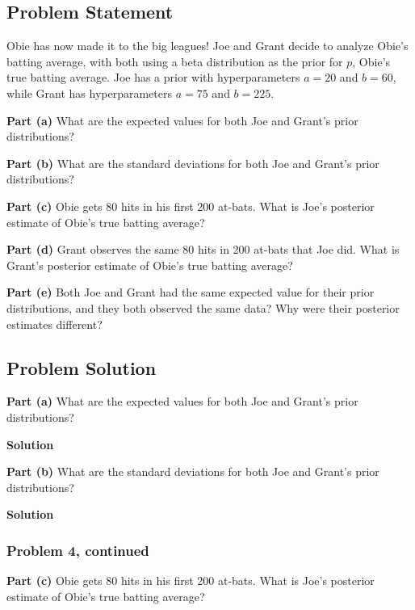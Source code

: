 \documentclass[12pt]{article}
\theoremstyle{definition}
\begin{document}
\subsection*{Problem Statement}

Obie has now made it to the big leagues! Joe and Grant decide to analyze Obie's batting average, with both using a beta distribution as the prior for $p$, Obie's true batting average. Joe has a prior with hyperparameters $a = 20$ and $b = 60$, while Grant has hyperparameters $a = 75$ and $b = 225$.

\bigskip
\noindent
{\bf Part (a)} What are the expected values for both Joe and Grant's prior distributions?

\bigskip
\noindent
{\bf Part (b)} What are the standard deviations for both Joe and Grant's prior distributions?

\bigskip
\noindent
{\bf Part (c)} Obie gets 80 hits in his first 200 at-bats. What is Joe's posterior estimate of Obie's true batting average?

\bigskip
\noindent
{\bf Part (d)} Grant observes the same 80 hits in 200 at-bats that Joe did. What is Grant's posterior estimate of Obie's true batting average?

\bigskip
\noindent
{\bf Part (e)} Both Joe and Grant had the same expected value for their prior distributions, and they both observed the same data? Why were their posterior estimates different?


\newpage
\subsection*{Problem Solution}
\bigskip
\noindent
{\bf Part (a)} What are the expected values for both Joe and Grant's prior distributions?

\bigskip
\noindent
{\bf Solution} 



\vspace{2in}
\noindent
{\bf Part (b)} What are the standard deviations for both Joe and Grant's prior distributions?

\bigskip
\noindent
{\bf Solution} 



\newpage
\subsubsection*{Problem 4, continued}

\noindent
{\bf Part (c)} Obie gets 80 hits in his first 200 at-bats. What is Joe's posterior estimate of Obie's true batting average?
\end{document}
